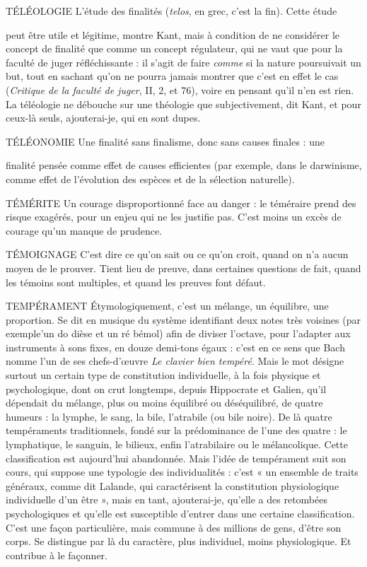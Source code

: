 TÉLÉOLOGIE L'étude des finalités ({\it telos}, en grec, c’est la fin). Cette étude

peut être utile et légitime, montre Kant, mais à condition de
ne considérer le concept de finalité que comme un concept régulateur, qui ne
vaut que pour la faculté de juger réfléchissante : il s’agit de faire {\it comme} si la
nature poursuivait un but, tout en sachant qu’on ne pourra jamais montrer que
c’est en effet le cas ({\it Critique de la faculté de juger}, II, 2,  et 76), voire en
pensant qu’il n’en est rien. La téléologie ne débouche sur une théologie que
subjectivement, dit Kant, et pour ceux-là seuls, ajouterai-je, qui en sont dupes.

TÉLÉONOMIE Une finalité sans finalisme, donc sans causes finales : une

finalité pensée comme effet de causes efficientes (par
exemple, dans le darwinisme, comme effet de l’évolution des espèces et de la
sélection naturelle).

TÉMÉRITE Un courage disproportionné face au danger : le téméraire prend
des risque exagérés, pour un enjeu qui ne les justifie pas. C’est
moins un excès de courage qu’un manque de prudence.

TÉMOIGNAGE C’est dire ce qu’on sait ou ce qu’on croit, quand on n’a
aucun moyen de le prouver. Tient lieu de preuve, dans certaines
questions de fait, quand les témoins sont multiples, et quand les preuves
font défaut.

TEMPÉRAMENT Étymologiquement, c’est un mélange, un équilibre, une
proportion. Se dit en musique du système identifiant
deux notes très voisines (par exemple’un do dièse et un ré bémol) afin de
diviser l’octave, pour l’adapter aux instruments à sons fixes, en douze demi-tons
égaux : c’est en ce sens que Bach nomme l’un de ses chefs-d’œuvre {\it Le
clavier bien tempéré}. Mais le mot désigne surtout un certain type de constitution
individuelle, à la fois physique et psychologique, dont on crut longtemps,
depuis Hippocrate et Galien, qu’il dépendait du mélange, plus ou
moins équilibré ou déséquilibré, de quatre humeurs : la lymphe, le sang, la
bile, l’atrabile (ou bile noire). De là quatre tempéraments traditionnels,
fondé sur la prédominance de l’une des quatre : le lymphatique, le sanguin,
le bilieux, enfin l’atrabilaire ou le mélancolique. Cette classification est
aujourd’hui abandonnée. Mais l’idée de tempérament suit son cours, qui
suppose une typologie des individualités : c’est « un ensemble de traits généraux,
comme dit Lalande, qui caractérisent la constitution physiologique
individuelle d’un être », mais en tant, ajouterai-je, qu’elle a des retombées
psychologiques et qu’elle est susceptible d’entrer dans une certaine classification.
C’est une façon particulière, mais commune à des millions de gens,
d’être son corps. Se distingue par là du caractère, plus individuel, moins physiologique.
Et contribue à le façonner.

